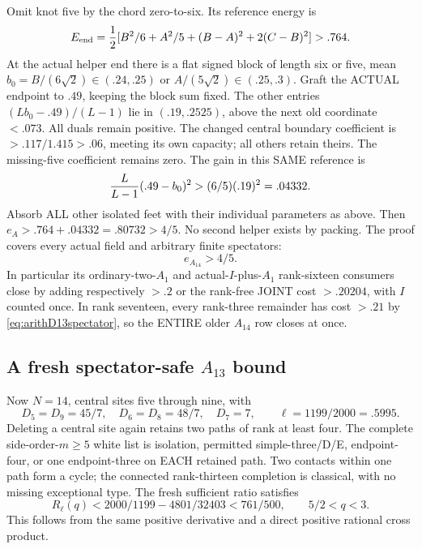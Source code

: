 Omit knot five by the chord zero-to-six.
Its reference energy is
\[
 E_{\rm end}={1\over2}
       [B^2/6+A^2/5+(B-A)^2+2(C-B)^2]>.764 .
\]
At the actual helper end there is a flat signed
block of length six or five, mean
\(b_0=B/(6\sqrt2)\in(.24,.25)\) or
\(A/(5\sqrt2)\in(.25,.3)\).
Graft the ACTUAL endpoint to \(.49\),
keeping the block sum fixed.
The other entries
\((Lb_0-.49)/(L-1)\) lie in \((.19,.2525)\),
above the next old coordinate \(<.073\).
All duals remain positive.
The changed central boundary coefficient is
\(>.117/1.415>.06\), meeting its own capacity;
all others retain theirs.
The missing-five coefficient remains zero.
The gain in this SAME reference is
\[
                  {L\over L-1}(.49-b_0)^2
                                  >(6/5)(.19)^2=.04332 .
\]
Absorb ALL other isolated feet with their
individual parameters as above.
Then \(e_A>.764+.04332=.80732>4/5\).
No second helper exists by packing.
The proof covers every actual field and
arbitrary finite spectators:
\[
                                  e_{A_{14}}>4/5 .
\tag{A14U}\label{eq:arithA14universal}
\]
In particular its ordinary-two-\(A_1\) and
actual-\(I\)-plus-\(A_1\) rank-sixteen consumers
close by adding respectively \(>.2\) or the
rank-free JOINT cost \(>.20204\), with \(I\)
counted once.
In rank seventeen, every rank-three remainder
has cost \(>.21\) by
\eqref{eq:arithD13spectator}, so the ENTIRE
older \(A_{14}\) row closes at once.

\subsection{A fresh spectator-safe \(A_{13}\) bound}
\label{app:arithA13universal}

Now \(N=14\), central sites five through nine,
with
\[
 D_5=D_9=45/7,\quad D_6=D_8=48/7,\quad D_7=7,\qquad
 \ell=1199/2000=.5995 .
\]
Deleting a central site again retains two
paths of rank at least four.
The complete side-order-\(m\ge5\) white list
is isolation, permitted simple-three/D/E,
endpoint-four, or one endpoint-three on EACH
retained path.
Two contacts within one path form a cycle;
the connected rank-thirteen completion is
classical, with no missing exceptional type.
The fresh sufficient ratio satisfies
\[
 R_\ell(q)<2000/1199-4801/32403<761/500,\qquad 5/2<q<3 .
\]
This follows from the same positive derivative
and a direct positive rational cross product.

